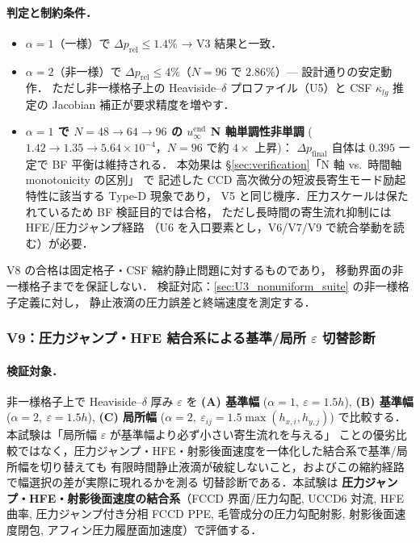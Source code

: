 \paragraph{判定と制約条件．}
\begin{itemize}\setlength{\itemsep}{0pt}
  \item $\alpha = 1$（一様）で $\Delta p_{\mathrm{rel}} \le 1.4\%$ → V3 結果と一致\checkmark．
  \item $\alpha = 2$（非一様）で $\Delta p_{\mathrm{rel}} \le 4\%$（$N=96$ で $2.86\%$）\checkmark — 設計通りの安定動作．
        ただし非一様格子上の Heaviside--$\delta$ プロファイル（U5）と CSF $\kappa_{lg}$ 推定の
        Jacobian 補正が要求精度を増やす．
  \item \textbf{$\alpha=1$ で $N=48\!\to\!64\!\to\!96$ の $u_\infty^{\mathrm{end}}$ N 軸単調性非単調}
        ($1.42\!\to\!1.35\!\to\!5.64\times10^{-4}$，$N=96$ で約 $4\times$ 上昇)：
        $\Delta p_{\mathrm{final}}$ 自体は $0.395$ 一定で BF 平衡は維持される．
        本効果は §\ref{sec:verification}「N 軸 vs.\ 時間軸 monotonicity の区別」 で
        記述した CCD 高次微分の短波長寄生モード励起特性に該当する Type-D 現象であり，
        V5 と同じ機序．圧力スケールは保たれているため BF 検証目的では合格，
        ただし長時間の寄生流れ抑制には HFE/圧力ジャンプ経路
        （U6 を入口要素とし，V6/V7/V9 で統合挙動を読む）が必要．
\end{itemize}
V8 の合格は固定格子・CSF 縮約静止問題に対するものであり，
移動界面の非一様格子までを保証しない．
検証対応：\autoref{sec:U3_nonuniform_suite} の非一様格子定義に対し，
静止液滴の圧力誤差と終端速度を測定する．

\FloatBarrier

\subsubsection{\texorpdfstring{V9：圧力ジャンプ・HFE 結合系による基準/局所 $\varepsilon$ 切替診断}{V9：圧力ジャンプ HFE 結合系による基準/局所 epsilon 切替診断}}
\label{sec:local_eps_validation}

\paragraph{検証対象．}
非一様格子上で Heaviside--$\delta$ 厚み $\varepsilon$ を
\textbf{(A) 基準幅} ($\alpha=1,\ \varepsilon=1.5h$),
\textbf{(B) 基準幅} ($\alpha=2,\ \varepsilon=1.5h$),
\textbf{(C) 局所幅} ($\alpha=2,\ \varepsilon_{ij}=1.5\max(h_{x,i},h_{y,j})$)
で比較する．本試験は「局所幅 $\varepsilon$ が基準幅より必ず小さい寄生流れを与える」
ことの優劣比較ではなく，圧力ジャンプ・HFE・射影後面速度を一体化した結合系で基準/局所幅を切り替えても
有限時間静止液滴が破綻しないこと，およびこの縮約経路で幅選択の差が実際に現れるかを測る
切替診断である．本試験は
\textbf{圧力ジャンプ・HFE・射影後面速度の結合系}（FCCD 界面/圧力勾配,
UCCD6 対流, HFE 曲率, 圧力ジャンプ付き分相 FCCD PPE,
毛管成分の圧力勾配射影, 射影後面速度閉包, アフィン圧力履歴面加速度）で評価する．

